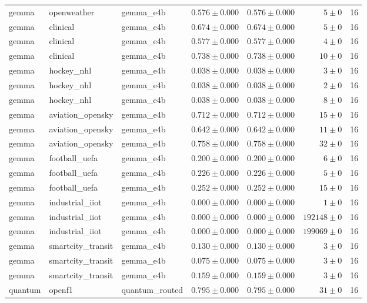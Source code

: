 \begin{table}[htbp]
\begin{tabular}{l l l r r r r}
gemma & openweather & gemma\_e4b & $0.576\pm0.000$ & $0.576\pm0.000$ & $5\pm0$ & 16 \\
gemma & clinical & gemma\_e4b & $0.674\pm0.000$ & $0.674\pm0.000$ & $5\pm0$ & 16 \\
gemma & clinical & gemma\_e4b & $0.577\pm0.000$ & $0.577\pm0.000$ & $4\pm0$ & 16 \\
gemma & clinical & gemma\_e4b & $0.738\pm0.000$ & $0.738\pm0.000$ & $10\pm0$ & 16 \\
gemma & hockey\_nhl & gemma\_e4b & $0.038\pm0.000$ & $0.038\pm0.000$ & $3\pm0$ & 16 \\
gemma & hockey\_nhl & gemma\_e4b & $0.038\pm0.000$ & $0.038\pm0.000$ & $2\pm0$ & 16 \\
gemma & hockey\_nhl & gemma\_e4b & $0.038\pm0.000$ & $0.038\pm0.000$ & $8\pm0$ & 16 \\
gemma & aviation\_opensky & gemma\_e4b & $0.712\pm0.000$ & $0.712\pm0.000$ & $15\pm0$ & 16 \\
gemma & aviation\_opensky & gemma\_e4b & $0.642\pm0.000$ & $0.642\pm0.000$ & $11\pm0$ & 16 \\
gemma & aviation\_opensky & gemma\_e4b & $0.758\pm0.000$ & $0.758\pm0.000$ & $32\pm0$ & 16 \\
gemma & football\_uefa & gemma\_e4b & $0.200\pm0.000$ & $0.200\pm0.000$ & $6\pm0$ & 16 \\
gemma & football\_uefa & gemma\_e4b & $0.226\pm0.000$ & $0.226\pm0.000$ & $5\pm0$ & 16 \\
gemma & football\_uefa & gemma\_e4b & $0.252\pm0.000$ & $0.252\pm0.000$ & $15\pm0$ & 16 \\
gemma & industrial\_iiot & gemma\_e4b & $0.000\pm0.000$ & $0.000\pm0.000$ & $1\pm0$ & 16 \\
gemma & industrial\_iiot & gemma\_e4b & $0.000\pm0.000$ & $0.000\pm0.000$ & $192148\pm0$ & 16 \\
gemma & industrial\_iiot & gemma\_e4b & $0.000\pm0.000$ & $0.000\pm0.000$ & $199069\pm0$ & 16 \\
gemma & smartcity\_transit & gemma\_e4b & $0.130\pm0.000$ & $0.130\pm0.000$ & $3\pm0$ & 16 \\
gemma & smartcity\_transit & gemma\_e4b & $0.075\pm0.000$ & $0.075\pm0.000$ & $3\pm0$ & 16 \\
gemma & smartcity\_transit & gemma\_e4b & $0.159\pm0.000$ & $0.159\pm0.000$ & $3\pm0$ & 16 \\
quantum & openf1 & quantum\_routed & $0.795\pm0.000$ & $0.795\pm0.000$ & $31\pm0$ & 16 \\

\end{tabular}
\end{table}
